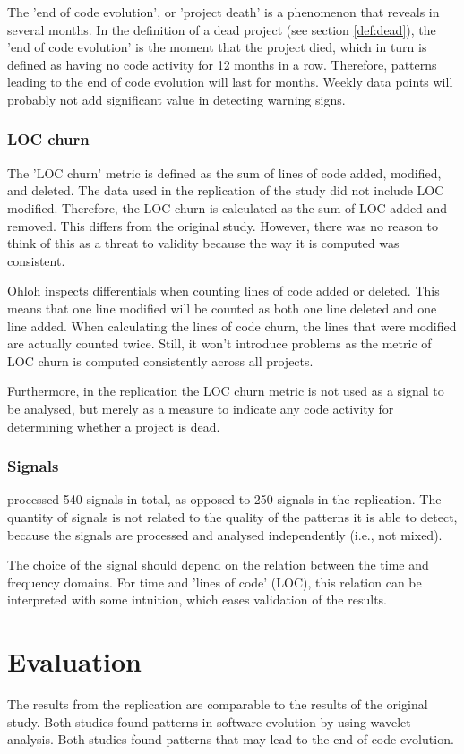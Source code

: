 The 'end of code evolution', or 'project death' is a phenomenon that reveals in
several months. In the definition of a dead project (see section
\ref{def:dead}), the 'end of code evolution' is the moment that the project
died, which in turn is defined as having no code activity for 12 months in a
row. Therefore, patterns leading to the end of code evolution will last for
months. Weekly data points will probably not add significant value in detecting
warning signs.

\subsubsection{LOC churn}
The 'LOC churn' metric is defined as the sum of lines of code added, modified,
and deleted. The data used in the replication of the study did not include LOC
modified. Therefore, the LOC churn is calculated as the sum of LOC added and
removed. This differs from the original study. However, there was no reason to
think of this as a threat to validity because the way it is computed was
consistent.

Ohloh inspects differentials when counting lines of code added or deleted. This
means that one line modified will be counted as both one line deleted and one
line added. When calculating the lines of code churn, the lines that were
modified are actually counted twice. Still, it won't introduce problems as the
metric of LOC churn is computed consistently across all projects.

Furthermore, in the replication the LOC churn metric is not used as a signal to
be analysed, but merely as a measure to indicate any code activity for
determining whether a project is dead.

\subsubsection{Signals}
\citeauthor{karus2013} processed 540 signals in total, as opposed to 250
signals in the replication. The quantity of signals is not related to the
quality of the patterns it is able to detect, because the signals are
processed and analysed independently (i.e., not mixed).

The choice of the signal should depend on the relation between the time and
frequency domains. For time and 'lines of code' (LOC), this relation can be
interpreted with some intuition, which eases validation of the results.

\section{Evaluation}
The results from the replication are comparable to the results of the original
study. Both studies found patterns in software evolution by using wavelet
analysis. Both studies found patterns that may lead to the end of code
evolution.

